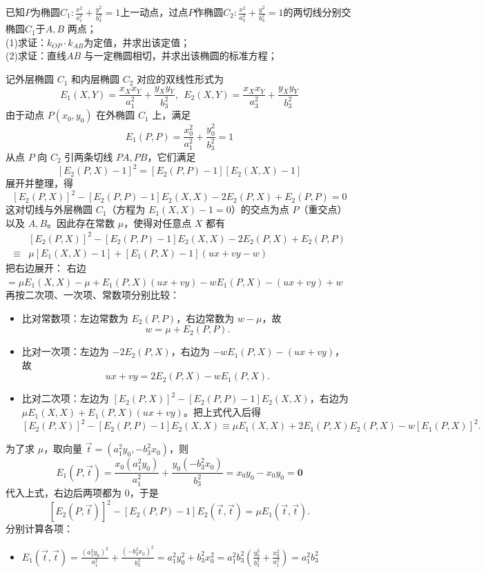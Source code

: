 \begin{exercise}
已知$P$为椭圆$C_1:\frac{x^2}{a_1^2}+\frac{y^2}{b_3^2}=1$上一动点，过点$P$作椭圆$C_{2}:\frac{x^2}{a_3^2}+\frac{y^2}{b_3^2}=1$的两切线分别交椭圆$C_1$于$A,B$ 两点；\\
(1)求证：$k_{OP}\cdot k_{AB}$为定值，并求出该定值；\\
(2)求证：直线$AB$ 与一定椭圆相切，并求出该椭圆的标准方程；
\end{exercise}
\begin{solution}
记外层椭圆 $C_1$ 和内层椭圆 $C_2$ 对应的双线性形式为
$$E_1(X,Y) = \frac{x_X x_Y}{a_1^2} + \frac{y_X y_Y}{b_3^2},~~ E_2(X,Y) = \frac{x_X x_Y}{a_3^2} + \frac{y_X y_Y}{b_3^2}$$
由于动点 $P(x_0, y_0)$ 在外椭圆 $C_1$ 上，满足
$$E_1(P,P) = \frac{x_0^2}{a_1^2} + \frac{y_0^2}{b_3^2} = 1$$
从点 $P$ 向 $C_2$ 引两条切线 $PA,PB$，它们满足
$$[E_2(P,X) - 1]^2 = [E_2(P,P) - 1][E_2(X,X) - 1]$$
展开并整理，得
$$[E_2(P,X)]^2 - [E_2(P,P) - 1]E_2(X,X) - 2E_2(P,X) + E_2(P,P) = 0$$
这对切线与外层椭圆 $C_1$（方程为 $E_1(X,X) - 1 = 0$）的交点为点 $P$（重交点）以及 $A,B$。因此存在常数 $\mu$，使得对任意点 $X$ 都有
\begin{align*}
&[E_2(P,X)]^2 - [E_2(P,P) - 1]E_2(X,X) - 2E_2(P,X) + E_2(P,P) \\
\equiv& \mu [E_1(X,X) - 1] + [E_1(P,X) - 1](ux + vy - w)
\end{align*}
把右边展开：
右边 $= \mu E_1(X,X) - \mu + E_1(P,X)(ux + vy) - w E_1(P,X) - (ux + vy) + w$
再按二次项、一次项、常数项分别比较：
\begin{itemize}
\item 比对常数项：左边常数为 $E_2(P,P)$，右边常数为 $w-\mu$，故
$$w = \mu + E_2(P,P).$$
\item 比对一次项：左边为 $-2E_2(P,X)$，右边为 $-w E_1(P,X) - (ux + vy)$，故
$$ux + vy = 2E_2(P,X) - w E_1(P,X).$$
\item 比对二次项：左边为 $[E_2(P,X)]^2 - [E_2(P,P) - 1]E_2(X,X)$，右边为 $\mu E_1(X,X) + E_1(P,X)(ux + vy)$。把上式代入后得
$$[E_2(P,X)]^2 - [E_2(P,P) - 1]E_2(X,X) \equiv \mu E_1(X,X) + 2E_1(P,X)E_2(P,X) - w[E_1(P,X)]^2.$$
\end{itemize}
为了求 $\mu$，取向量 $\vec{t} = (a_1^2 y_0, -b_3^2 x_0)$，则
\[E_1(P, \vec{t}) = \frac{x_0(a_1^2 y_0)}{a_1^2} + \frac{y_0(-b_3^2 x_0)}{b_3^2} = x_0 y_0 - x_0 y_0 = \mathbf{0}\] 
代入上式，右边后两项都为 $0$，于是
$$[E_2(P,\vec{t})]^2 - [E_2(P,P) - 1]E_2(\vec{t},\vec{t}) = \mu E_1(\vec{t},\vec{t}).$$
分别计算各项：
\begin{itemize}
\item $\displaystyle E_1(\vec{t},\vec{t}) = \frac{(a_1^2 y_0)^2}{a_1^2} + \frac{(-b_3^2 x_0)^2}{b_3^2} = a_1^2 y_0^2 + b_3^2 x_0^2 = a_1^2 b_3^2 \left(\frac{y_0^2}{b_3^2} + \frac{x_0^2}{a_1^2}\right) = {a_1^2 b_3^2}$

\end{itemize}
\end{solution}
